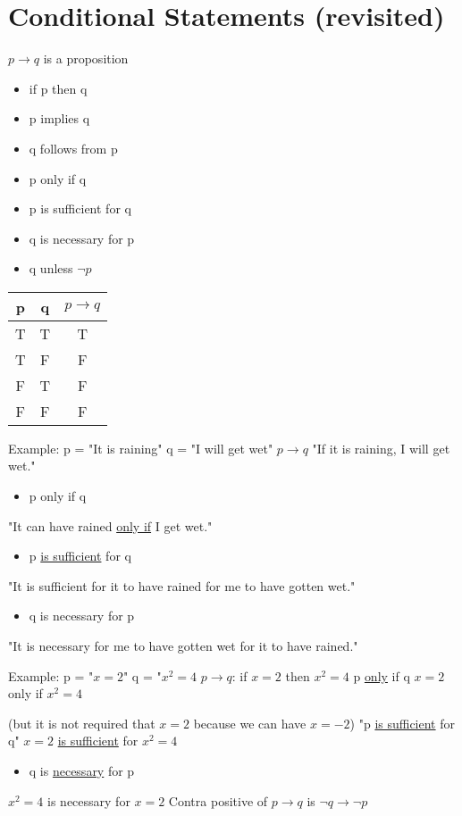 \documentclass{article}
\begin{document}
\section{Conditional Statements (revisited)}
$p \rightarrow q$ is a proposition
\begin{itemize}
    \item if p then q
    \item p implies q
    \item q follows from p
    \item p only if q
    \item p is sufficient for q
    \item q is necessary for p
    \item q unless $\neg p$
\end{itemize}
\begin{center}
\begin{tabular}{ |c|c|c| } 
 \hline
 p & q & $p\rightarrow q$ \\ 
 \hline
 T & T & T \\ 
 T & F & F \\
 F & T & F \\
 F & F & F \\
 \hline
\end{tabular}
\end{center}
Example:
\hfill \break
p = "It is raining"
\hfill \break
q = "I will get wet"
\hfill \break
$p \rightarrow q$ "If it is raining, I will get wet."
\begin{itemize}
    \item p only if q
\end{itemize}
"It can have rained \underline{only if} I get wet."
\begin{itemize}
    \item p \underline{is sufficient} for q
\end{itemize}
"It is sufficient for it to have rained for me to have gotten wet."
\begin{itemize}
    \item q is necessary for p
\end{itemize}
"It is necessary for me to have gotten wet for it to have rained."

\hfill \break
Example:
\hfill \break
p = "$x=2$"
\hfill \break
q = "$x^2=4$
\hfill \break
$p\rightarrow q$: if $x=2$ then $x^2=4$
\hfill \break
p \underline{only} if q
\hfill \break
$x=2$ only if $x^2=4$

(but it is not required that $x=2$ because we can have $x=-2$)
\hfill \break
"p \underline{is sufficient} for q"
\hfill \break
$x=2$ \underline{is sufficient} for $x^2=4$
\begin{itemize}
    \item q is \underline{necessary} for p
\end{itemize}
$x^2=4$ is necessary for $x=2$
\hfill \break
Contra positive of $p\rightarrow q$ is $\neg q\rightarrow \neg p$
\end{document}
